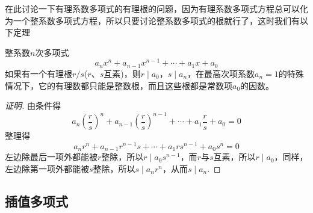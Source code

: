 在此讨论一下有理系数多项式的有理根的问题，因为有理系数多项式方程总可以化为一个整系数多项式方程，所以只要讨论整系数多项式的根就行了，这时我们有以下定理
\begin{theorem}
  整系数$n$次多项式
  \[ a_nx^n+a_{n-1}x^{n-1}+\cdots+a_1x+a_0 \]
  如果有一个有理根$r/s$($r$、$s$互素)，则$r \mid a_0$，$s \mid a_n$，在最高次项系数$a_n=1$的特殊情况下，它的有理数都只能是整数根，而且这些根都是常数项$a_0$的因数。
\end{theorem}

\begin{proof}[证明]
  由条件得
  \[ a_n \left( \frac{r}{s} \right)^{n} + a_{n-1}\left( \frac{r}{s} \right)^{n-1} + \cdots + a_1 \frac{r}{s} + a_0 = 0 \]
  整理得
  \[ a_nr^n + a_{n-1}r^{n-1}s + \cdots + a_1rs^{n-1} + a_0s^n = 0 \]
  左边除最后一项外都能被$r$整除，所以$r \mid a_0s^{n-1}$，而$r$与$s$互素，所以$r \mid a_0$，同样，左边除第一项外都能被$s$整除，所以$s \mid a_nr^n$，从而$s \mid a_n$.
\end{proof}

\subsection{插值多项式}
\label{sec:interpolation-polynome}






